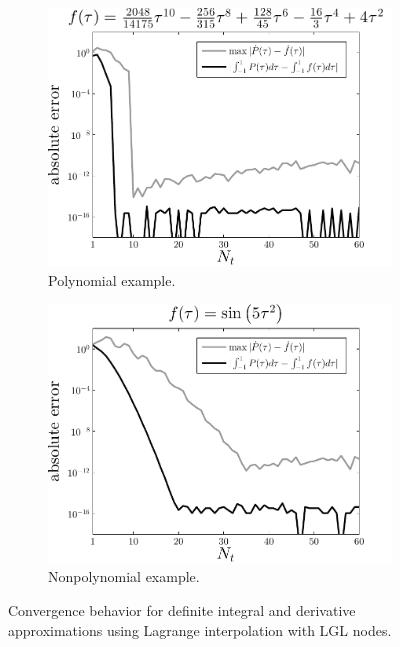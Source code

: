 \begin{figure}
\centering
\begin{subfigure}[b]{0.6\textwidth}
\centering
\includegraphics[width=\textwidth]{../app3/figures/integration-1}
\caption{Polynomial example. \label{fig:int-1}}
\end{subfigure}

\begin{subfigure}[b]{0.6\textwidth}
\centering
\includegraphics[width=\textwidth]{../app3/figures/integration-2}
\caption{Nonpolynomial example. \label{fig:int-2}}
\end{subfigure}

\caption[Convergence behavior for definite integral and derivative approximations using Lagrange interpolation with LGL nodes]{Convergence behavior for definite integral and derivative approximations using Lagrange interpolation with LGL nodes. \label{fig:int}}
\end{figure}

